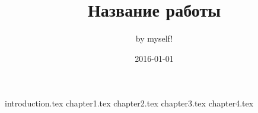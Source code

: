 \documentclass[a4paper,12pt]{article}
\title {Название работы}
\date {2016-01-01}
\author {by myself!}
\begin{document}
	\maketitle
	\clearpage
	\setcounter{page}{2}
	\tableofcontents
	\clearpage
	 {introduction.tex}
	\clearpage
	 {chapter1.tex}
	\clearpage
	 {chapter2.tex}
	\clearpage
	 {chapter3.tex}
	\clearpage
	 {chapter4.tex}
	\clearpage
	\renewcommand{\refname}{Список использованных источников}
	
	
\end{document}
